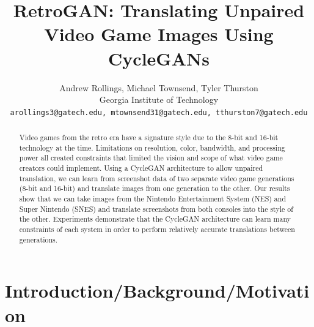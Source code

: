 \documentclass[10pt,twocolumn,letterpaper]{article}
\begin{document}
\title{RetroGAN: Translating Unpaired Video Game Images Using CycleGANs}

\author{Andrew Rollings, Michael Townsend, Tyler Thurston\\
Georgia Institute of Technology\\
{\tt\small arollings3@gatech.edu, mtownsend31@gatech.edu, tthurston7@gatech.edu}
}

\maketitle

\begin{abstract}
   Video games from the retro era have a signature style due to the 8-bit and 16-bit technology at the time. Limitations on resolution, color, bandwidth, and processing power all created constraints that limited the vision and scope of what video game creators could implement. Using a CycleGAN architecture to allow unpaired translation, we can learn from screenshot data of two separate video game generations (8-bit and 16-bit) and translate images from one generation to the other. Our results show that we can take images from the Nintendo Entertainment System (NES) and Super Nintendo (SNES) and translate screenshots from both consoles into the style of the other. Experiments demonstrate that the CycleGAN architecture can learn many constraints of each system in order to perform relatively accurate translations between generations.
\end{abstract}

\section{Introduction/Background/Motivation}
\end{document}
